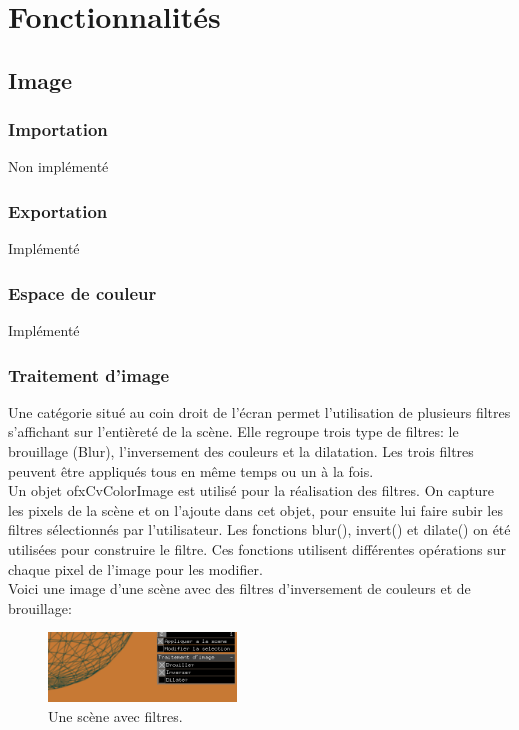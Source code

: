 \newcommand\tab[1][1cm]{\hspace*{#1}}

\chapter{Fonctionnalités}
\label{s:fonctionnalite}

\section{Image}
\subsection{Importation}
Non implémenté

\subsection{Exportation}
Implémenté

\subsection{Espace de couleur}
Implémenté

\subsection{Traitement d'image}
Une catégorie situé au coin droit de l’écran permet l’utilisation de plusieurs filtres s’affichant sur l’entièreté de la scène. Elle regroupe trois type de filtres: le brouillage (Blur), l’inversement des couleurs et la dilatation. Les trois filtres peuvent être appliqués tous en même temps ou un à la fois.\\

Un objet ofxCvColorImage est utilisé pour la réalisation des filtres. On capture les pixels de la scène et on l’ajoute dans cet objet, pour ensuite lui faire subir les filtres sélectionnés par l’utilisateur. Les fonctions blur(), invert() et dilate() on été utilisées pour construire le filtre. Ces fonctions utilisent différentes opérations sur chaque pixel de l’image pour les modifier.\\

Voici une image d’une scène avec des filtres d’inversement de couleurs et de brouillage:\\
\begin{figure}[h]
	\centering
	\includegraphics[width=5cm]{fig/filters.png}
	\caption{Une scène avec filtres.}
	\label{fig:filtres}
\end{figure}



